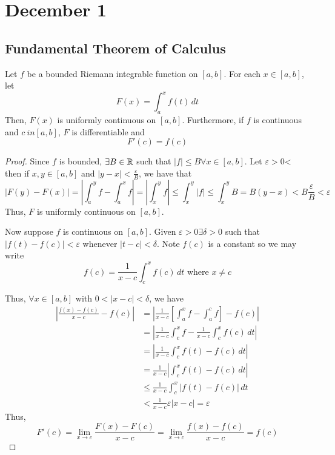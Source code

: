 \section{December 1}

\subsection{Fundamental Theorem of Calculus}
\begin{theorem}
    Let $f$ be a bounded Riemann integrable function on $[a, b]$. For each $x \in [a, b]$, let $$F(x) = \int_a^x f(t) \, dt$$ Then, $F(x)$ is uniformly continuous on $[a, b]$. Furthermore, if $f$ is continuous and $c \ in [a, b]$, $F$ is differentiable and $$F'(c) = f(c)$$
\end{theorem}
\begin{proof}
    Since $f$ is bounded, $\exists B \in \mathbb{R}$ such that $|f| \leq B \forall x \in [a, b]$. Let $\varepsilon > 0$< then if $x, y \in [a, b]$ and $|y - x| < \frac{\varepsilon}{B}$, we have that $$|F(y) - F(x)| = \left|\int_a^y f - \int_a^x f\right| = \left|\int_x^y f\right| \leq \int_x^y |f| \leq \int_x^y B = B(y - x) < B \frac{\varepsilon}{B}< \varepsilon$$ Thus, $F$ is uniformly continuous on $[a, b]$.

    Now suppose $f$ is continuous on $[a, b]$. Given $\varepsilon > 0 \exists \delta > 0$ such that $|f(t) - f(c)| < \varepsilon$ whenever $|t - c| < \delta$. Note $f(c)$ is a constant so we may write $$f(c) = \frac{1}{x - c} \int_c^x f(c) \, dt \text{ where } x \neq c$$
    
    Thus, $\forall x \in [a, b]$ with $0 < |x - c| < \delta$, we have
    \begin{align*}
        \left|\frac{f(x) - f(c)}{x - c} - f(c)\right| &= \left|\frac{1}{x - c} \left[\int_a^x f - \int_a^c f\right] - f(c) \right| \\
        &= \left|\frac{1}{x - c} \int_c^x f - \frac{1}{x - c} \int_c^x f(c) \, dt\right| \\
        &= \left|\frac{1}{x - c} \int_c^x f(t) - f(c) \, dt\right| \\
        &= \frac{1}{x - c} \left|\int_c^x f(t) - f(c) \, dt\right| \\
        &\leq \frac{1}{x - c} \int_c^x |f(t) - f(c)| \, dt \\
        &< \frac{1}{x - c} \varepsilon |x - c| = \varepsilon
    \end{align*}
    Thus, $$F'(c) = \lim_{x \to c} \frac{F(x) - F(c)}{x - c} = \lim_{x \to c} \frac{f(x) - f(c)}{x - c} = f(c)$$
\end{proof}
\pagebreak

